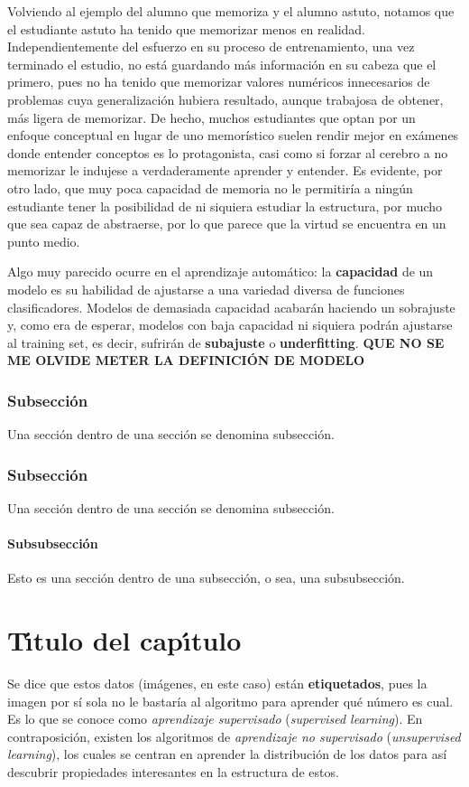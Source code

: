 \documentclass[a4paper, 12pt, oneside]{book}
\begin{document}
Volviendo al ejemplo del alumno que memoriza y el alumno astuto, notamos que el 
estudiante astuto ha tenido que memorizar menos en 
realidad. Independientemente del esfuerzo en su proceso de entrenamiento,
una vez terminado el estudio, no está guardando más información en su cabeza que el primero,
pues no ha tenido que memorizar valores numéricos innecesarios de problemas cuya 
generalización hubiera resultado, aunque trabajosa de obtener, más ligera de memorizar.
De hecho, muchos estudiantes que optan por un enfoque conceptual en lugar de uno memorístico suelen rendir mejor en
exámenes donde entender conceptos es lo protagonista, casi como si forzar al cerebro a no
memorizar le indujese a verdaderamente aprender y entender. Es evidente, por otro lado, 
que muy poca capacidad de memoria no le permitiría a ningún estudiante tener la posibilidad
de ni siquiera estudiar la estructura, por mucho que sea capaz de abstraerse, por lo que 
parece que la virtud se encuentra en un punto medio.

Algo muy parecido ocurre en el aprendizaje automático: la \textbf{capacidad} de un modelo
es su habilidad de ajustarse a una variedad diversa de funciones clasificadores.
Modelos de demasiada capacidad acabarán haciendo un sobrajuste y, como era de esperar, 
modelos con baja capacidad ni siquiera podrán ajustarse al training set, es decir, 
sufrirán de \textbf{subajuste} o \textbf{underfitting}. \textbf{QUE NO SE ME OLVIDE METER LA DEFINICIÓN DE MODELO}












\subsection{Subsecci\'{o}n}
Una secci\'{o}n dentro de una secci\'{o}n se denomina subsecci\'{o}n.
\subsection{Subsecci\'{o}n}
Una secci\'{o}n dentro de una secci\'{o}n se denomina subsecci\'{o}n.
\subsubsection{Subsubsecci\'{o}n}
Esto es una secci\'{o}n dentro de una subsecci\'{o}n, o sea, una subsubsecci\'{o}n.


\chapter{T\'{\i}tulo del cap\'{\i}tulo}
Se dice que estos datos (imágenes, en este caso) están \textbf{etiquetados}, pues la imagen por sí sola no le bastaría al algoritmo para aprender qué número es cual. 
Es lo que se conoce como \textit{aprendizaje supervisado} (\textit{supervised learning}). En contraposición, existen los algoritmos de \textit{aprendizaje no supervisado} 
(\textit{unsupervised learning}), los cuales se centran en aprender la distribución de los datos para así descubrir propiedades interesantes en la estructura de estos. 
\end{document}
